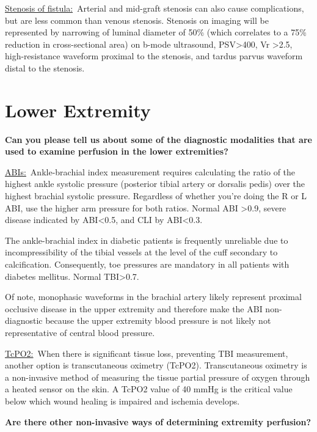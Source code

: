 \documentclass[
]{book}
\begin{document}
\uline{Stenosis of fistula:}~Arterial and mid-graft stenosis can
also cause complications, but are less common than venous stenosis.
Stenosis on imaging will be represented by narrowing of luminal diameter
of 50\% (which correlates to a 75\% reduction in cross-sectional area) on
b-mode ultrasound, PSV\textgreater400, Vr \textgreater2.5, high-resistance waveform proximal
to the stenosis, and tardus parvus waveform distal to the
stenosis.\citep{bandyk2013}

\hypertarget{lower-extremity-1}{%
\section{Lower Extremity}\label{lower-extremity-1}}

\textbf{Can you please tell us about some of the diagnostic modalities that
are used to examine perfusion in the lower extremities?}

\uline{ABIs:}~Ankle-brachial index measurement requires
calculating the ratio of the highest ankle systolic pressure (posterior
tibial artery or dorsalis pedis) over the highest brachial systolic
pressure. Regardless of whether you're doing the R or L ABI, use the
higher arm pressure for both ratios. Normal ABI \textgreater0.9, severe disease
indicated by ABI\textless0.5, and CLI by ABI\textless0.3.

The ankle-brachial index in diabetic patients is frequently unreliable
due to incompressibility of the tibial vessels at the level of the cuff
secondary to calcification. Consequently, toe pressures are mandatory in
all patients with diabetes mellitus. Normal TBI\textgreater0.7.

Of note, monophasic waveforms in the brachial artery likely represent
proximal occlusive disease in the upper extremity and therefore make the
ABI non-diagnostic because the upper extremity blood pressure is not
likely not representative of central blood pressure.\citep{chen2014}

\uline{TcPO2:}~When there is significant tissue loss, preventing
TBI measurement, another option is transcutaneous oximetry
(TcPO2).\citep{mills2014} Transcutaneous oximetry is a non-invasive method of
measuring the tissue partial pressure of oxygen through a heated sensor
on the skin. A TcPO2 value of 40 mmHg is the critical value below which
wound healing is impaired and ischemia develops.

\textbf{Are there other non-invasive ways of determining extremity
perfusion?}
\end{document}
